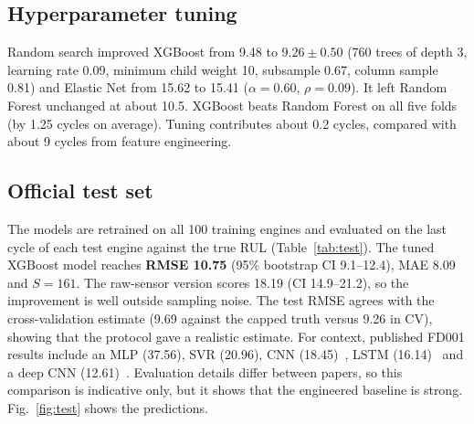 \documentclass[conference]{IEEEtran}
\begin{document}
\subsection{Hyperparameter tuning}
Random search improved XGBoost from 9.48 to $9.26\pm0.50$ (760 trees of depth 3, learning rate 0.09, minimum child weight 10, subsample 0.67, column sample 0.81) and Elastic Net from 15.62 to 15.41 ($\alpha=0.60$, $\rho=0.09$). It left Random Forest unchanged at about 10.5. XGBoost beats Random Forest on all five folds (by 1.25 cycles on average). Tuning contributes about 0.2 cycles, compared with about 9 cycles from feature engineering.

\subsection{Official test set}
The models are retrained on all 100 training engines and evaluated on the last cycle of each test engine against the true RUL (Table~\ref{tab:test}). The tuned XGBoost model reaches \textbf{RMSE 10.75} (95\% bootstrap CI 9.1--12.4), MAE 8.09 and $S=161$. The raw-sensor version scores 18.19 (CI 14.9--21.2), so the improvement is well outside sampling noise. The test RMSE agrees with the cross-validation estimate (9.69 against the capped truth versus 9.26 in CV), showing that the protocol gave a realistic estimate. For context, published FD001 results include an MLP (37.56), SVR (20.96), CNN (18.45)~\cite{babu2016cnn}, LSTM (16.14)~\cite{zheng2017lstm} and a deep CNN (12.61)~\cite{li2018dcnn}. Evaluation details differ between papers, so this comparison is indicative only, but it shows that the engineered baseline is strong. Fig.~\ref{fig:test} shows the predictions.

\begin{table}[t]
\centering
\small
\setlength{\tabcolsep}{4pt}
\caption{Official FD001 test set (last cycle, true RUL)}
\label{tab:test}
\end{table}
\end{document}
